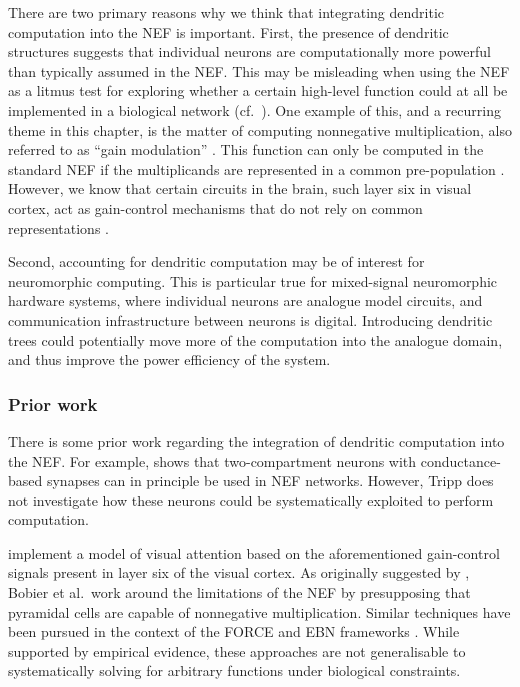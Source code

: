 There are two primary reasons why we think that integrating dendritic computation into the NEF is important.
First, the presence of dendritic structures suggests that individual neurons are computationally more powerful than typically assumed in the NEF.
This may be misleading when using the NEF as a litmus test for exploring whether a certain high-level function could at all be implemented in a biological network (cf.~).
One example of this, and a recurring theme in this chapter, is the matter of computing nonnegative multiplication, also referred to as \enquote{gain modulation} \citep{salinas2000gain}.
This function can only be computed in the standard NEF if the multiplicands are represented in a common pre-population \citep[Section~6.3]{eliasmith2003neural}.
However, we know that certain circuits in the brain, such layer six in visual cortex, act as gain-control mechanisms that do not rely on common representations \citep{olsen2012gain,bobier2014unifying}.

Second, accounting for dendritic computation may be of interest for neuromorphic computing.
This is particular true for mixed-signal neuromorphic hardware systems, where individual neurons are analogue model circuits, and communication infrastructure between neurons is digital.
Introducing dendritic trees could potentially move more of the computation into the analogue domain, and thus improve the power efficiency of the system.

\subsubsection{Prior work}
There is some prior work regarding the integration of dendritic computation into the NEF.
For example,  shows that two-compartment neurons with conductance-based synapses can in principle be used in NEF networks.
However, Tripp does not investigate how these neurons could be systematically exploited to perform computation.

 implement a model of visual attention based on the aforementioned gain-control signals present in layer six of the visual cortex.
As originally suggested by , Bobier et al.~work around the limitations of the NEF by presupposing that pyramidal cells are capable of nonnegative multiplication.
Similar techniques have been pursued in the context of the FORCE and EBN frameworks \citep{thalmeier2016learning,alemi2018learning}.
While supported by empirical evidence, these approaches are not generalisable to systematically solving for arbitrary functions under biological constraints.

